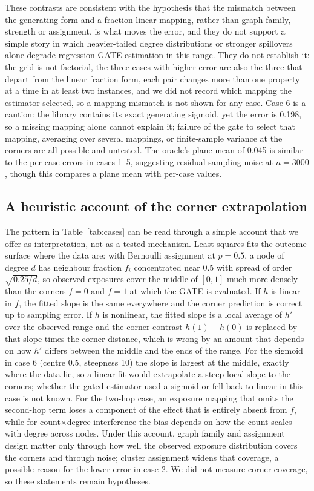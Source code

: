 \documentclass{article}
\begin{document}
These contrasts are consistent with the hypothesis that the mismatch between the generating form and a fraction-linear mapping, rather than graph family, strength or assignment, is what moves the error, and they do not support a simple story in which heavier-tailed degree distributions or stronger spillovers alone degrade regression GATE estimation in this range. They do not establish it: the grid is not factorial, the three cases with higher error are also the three that depart from the linear fraction form, each pair changes more than one property at a time in at least two instances, and we did not record which mapping the estimator selected, so a mapping mismatch is not shown for any case. Case 6 is a caution: the library contains its exact generating sigmoid, yet the error is 0.198, so a missing mapping alone cannot explain it; failure of the gate to select that mapping, averaging over several mappings, or finite-sample variance at the corners are all possible and untested. The oracle's plane mean of 0.045 is similar to the per-case errors in cases 1--5, suggesting residual sampling noise at $n=3000$, though this compares a plane mean with per-case values.

\subsection{A heuristic account of the corner extrapolation}\label{sec:corner}
The pattern in Table~\ref{tab:cases} can be read through a simple account that we offer as interpretation, not as a tested mechanism. Least squares fits the outcome surface where the data are: with Bernoulli assignment at $p=0.5$, a node of degree $d$ has neighbour fraction $f_i$ concentrated near 0.5 with spread of order $\sqrt{0.25/d}$, so observed exposures cover the middle of $[0,1]$ much more densely than the corners $f=0$ and $f=1$ at which the GATE is evaluated. If $h$ is linear in $f$, the fitted slope is the same everywhere and the corner prediction is correct up to sampling error. If $h$ is nonlinear, the fitted slope is a local average of $h'$ over the observed range and the corner contrast $h(1)-h(0)$ is replaced by that slope times the corner distance, which is wrong by an amount that depends on how $h'$ differs between the middle and the ends of the range. For the sigmoid in case 6 (centre 0.5, steepness 10) the slope is largest at the middle, exactly where the data lie, so a linear fit would extrapolate a steep local slope to the corners; whether the gated estimator used a sigmoid or fell back to linear in this case is not known. For the two-hop case, an exposure mapping that omits the second-hop term loses a component of the effect that is entirely absent from $f$, while for count$\times$degree interference the bias depends on how the count scales with degree across nodes. Under this account, graph family and assignment design matter only through how well the observed exposure distribution covers the corners and through noise; cluster assignment widens that coverage, a possible reason for the lower error in case 2. We did not measure corner coverage, so these statements remain hypotheses.
\end{document}

